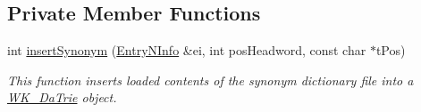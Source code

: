 \subsection*{Private Member Functions}
\begin{CompactItemize}
\item 
int \hyperlink{classkmaOrange_1_1SynonymContainer_3f4902b3981d89207b1be2298b10fd7d}{insertSynonym} (\hyperlink{classkmaOrange_1_1EntryNInfo}{EntryNInfo} \&ei, int posHeadword, const char $\ast$tPos)
\begin{CompactList}\small\item\em This function inserts loaded contents of the synonym dictionary file into a \hyperlink{classkmaOrange_1_1WK__DaTrie}{WK\_\-DaTrie} object. \item\end{CompactList}\end{CompactItemize}
